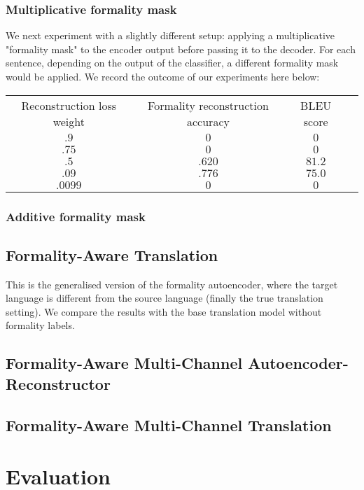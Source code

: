 \documentclass[11pt]{article}
\begin{document}
\subsubsection{Multiplicative formality mask}

We next experiment with a slightly different setup: applying a multiplicative "formality mask" to the encoder output before passing it to the decoder. For each sentence, depending on the output of the classifier, a different formality mask would be applied. We record the outcome of our experiments here below:

\begin{tabular}{ c c c c }
    Reconstruction loss weight & Formality reconstruction accuracy & BLEU score \\
    $.9$ & $0$ & $0$ \\
    $.75$ & $0$ & $0$ \\
    $.5$ & $.620$ & $81.2$ \\
    $.09$ & $.776$ & $75.0$ \\
    $.0099$ & $0$ & $0$ \\
\end{tabular}

\subsubsection{Additive formality mask}

\subsection{Formality-Aware Translation}

This is the generalised version of the formality autoencoder, where the target language is different from the source language (finally the true translation setting). We compare the results with the base translation model without formality labels.

\subsection{Formality-Aware Multi-Channel Autoencoder-Reconstructor}

\subsection{Formality-Aware Multi-Channel Translation}

\section{Evaluation}
\end{document}

